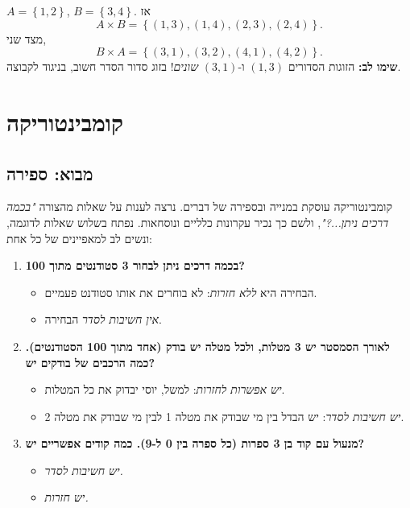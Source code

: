 \documentclass[11pt,a4paper]{report}
\newcommand{\set}[1]{\left\{#1\right\}}
\begin{document}
\begin{example}{}{}
$A=\set{1,2}$, $B=\set{3,4}$. אז
\[
  A\times B=\set{(1,3),(1,4),(2,3),(2,4)}.
\]
מצד שני,
\[
  B\times A=\set{(3,1),(3,2),(4,1),(4,2)}.
\]
\textbf{שימו לב:} הזוגות הסדורים $(1,3)$ ו-$(3,1)$ \emph{שונים}! בזוג סדור הסדר חשוב, בניגוד לקבוצה.
\end{example}


\chapter{קומבינטוריקה}

\section{מבוא: ספירה}

קומבינטוריקה עוסקת במנייה ובספירה של דברים. נרצה לענות על שאלות מהצורה \emph{"בכמה דרכים ניתן...?"}, ולשם כך נכיר עקרונות כלליים ונוסחאות. נפתח בשלוש שאלות לדוגמה, ונשים לב למאפיינים של כל אחת:

\begin{enumerate}[label=\textbf{(\arabic*)}]
  \item \textbf{בכמה דרכים ניתן לבחור 3 סטודנטים מתוך 100?}
  \begin{itemize}
    \item הבחירה היא \emph{ללא חזרות}: לא בוחרים את אותו סטודנט פעמיים.
    \item \emph{אין חשיבות לסדר} הבחירה.
  \end{itemize}

  \item \textbf{לאורך הסמסטר יש 3 מטלות, ולכל מטלה יש בודק (אחד מתוך 100 הסטודנטים). כמה הרכבים של בודקים יש?}
  \begin{itemize}
    \item \emph{יש אפשרות לחזרות}: למשל, יוסי יבדוק את כל המטלות.
    \item \emph{יש חשיבות לסדר}: יש הבדל בין מי שבודק את מטלה 1 לבין מי שבודק את מטלה 2.
  \end{itemize}

  \item \textbf{מנעול עם קוד בן 3 ספרות (כל ספרה בין 0 ל-9). כמה קודים אפשריים יש?}
  \begin{itemize}
    \item \emph{יש חשיבות לסדר.}
    \item \emph{יש חזרות.}
  \end{itemize}
\end{enumerate}
\end{document}

